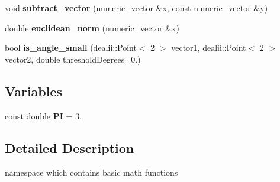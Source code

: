 \begin{DoxyCompactItemize}
\item 
\hypertarget{namespacenatrium_1_1Math_aa836548ce124ae68fe267d0c988add9b}{void {\bfseries subtract\-\_\-vector} (numeric\-\_\-vector \&x, const numeric\-\_\-vector \&y)}\label{namespacenatrium_1_1Math_aa836548ce124ae68fe267d0c988add9b}

\item 
\hypertarget{namespacenatrium_1_1Math_a3fbf64e851a081a568d1fce928380074}{double {\bfseries euclidean\-\_\-norm} (numeric\-\_\-vector \&x)}\label{namespacenatrium_1_1Math_a3fbf64e851a081a568d1fce928380074}

\item 
\hypertarget{namespacenatrium_1_1Math_a55469b55d9a0f80edfed2aecb95fe73d}{bool {\bfseries is\-\_\-angle\-\_\-small} (dealii\-::\-Point$<$ 2 $>$ vector1, dealii\-::\-Point$<$ 2 $>$ vector2, double threshold\-Degrees=0.)}\label{namespacenatrium_1_1Math_a55469b55d9a0f80edfed2aecb95fe73d}

\end{DoxyCompactItemize}
\subsection*{Variables}
\begin{DoxyCompactItemize}
\item 
\hypertarget{namespacenatrium_1_1Math_a1ef5edf004cf147f3b3e9d36a7af4b00}{const double {\bfseries P\-I} = 3.}\label{namespacenatrium_1_1Math_a1ef5edf004cf147f3b3e9d36a7af4b00}

\end{DoxyCompactItemize}


\subsection{Detailed Description}
namespace which contains basic math functions 